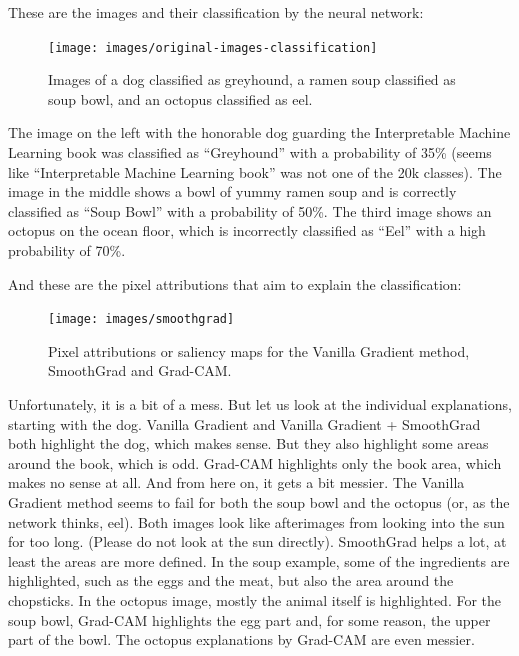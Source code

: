 \documentclass[
  11pt,
]{scrbook}
\begin{document}
These are the images and their classification by the neural network:

\begin{figure}

{\centering \texttt{[image: images/original-images-classification]} 

}

\caption{Images of a dog classified as greyhound, a ramen soup classified as soup bowl, and an octopus classified as eel.}\label{fig:unnamed-chunk-59}
\end{figure}

The image on the left with the honorable dog guarding the Interpretable Machine Learning book was classified as ``Greyhound'' with a probability of 35\% (seems like ``Interpretable Machine Learning book'' was not one of the 20k classes).
The image in the middle shows a bowl of yummy ramen soup and is correctly classified as ``Soup Bowl'' with a probability of 50\%.
The third image shows an octopus on the ocean floor, which is incorrectly classified as ``Eel'' with a high probability of 70\%.

And these are the pixel attributions that aim to explain the classification:

\begin{figure}

{\centering \texttt{[image: images/smoothgrad]} 

}

\caption{Pixel attributions or saliency maps for the Vanilla Gradient method, SmoothGrad and Grad-CAM.}\label{fig:unnamed-chunk-60}
\end{figure}

Unfortunately, it is a bit of a mess.
But let us look at the individual explanations, starting with the dog.
Vanilla Gradient and Vanilla Gradient + SmoothGrad both highlight the dog, which makes sense.
But they also highlight some areas around the book, which is odd.
Grad-CAM highlights only the book area, which makes no sense at all.
And from here on, it gets a bit messier.
The Vanilla Gradient method seems to fail for both the soup bowl and the octopus (or, as the network thinks, eel).
Both images look like afterimages from looking into the sun for too long.
(Please do not look at the sun directly).
SmoothGrad helps a lot, at least the areas are more defined.
In the soup example, some of the ingredients are highlighted, such as the eggs and the meat, but also the area around the chopsticks.
In the octopus image, mostly the animal itself is highlighted.
For the soup bowl, Grad-CAM highlights the egg part and, for some reason, the upper part of the bowl.
The octopus explanations by Grad-CAM are even messier.
\end{document}
